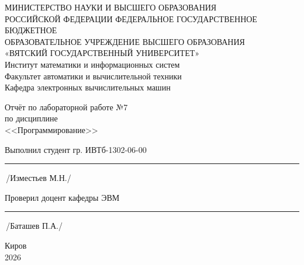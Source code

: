 \documentclass[oneside,a4paper,14pt]{extarticle}
\begin{document}
    \newpage\thispagestyle{empty}
    \begin{center}
        МИНИСТЕРСТВО НАУКИ И ВЫСШЕГО ОБРАЗОВАНИЯ\\
            РОССИЙСКОЙ ФЕДЕРАЦИИ
            ФЕДЕРАЛЬНОЕ ГОСУДАРСТВЕННОЕ БЮДЖЕТНОЕ\\
            ОБРАЗОВАТЕЛЬНОЕ
            УЧРЕЖДЕНИЕ ВЫСШЕГО ОБРАЗОВАНИЯ\\
            «ВЯТСКИЙ ГОСУДАРСТВЕННЫЙ УНИВЕРСИТЕТ»\\
            Институт математики и информационных систем\\
            Факультет автоматики и вычислительной техники\\
            Кафедра электронных вычислительных машин
    \end{center}
    \vspace{20mm}

    \begin{center}
        Отчёт по лабораторной работе №7\\
        по дисциплине\\
        <<Программирование>>\\
    \end{center}
    \vspace{48mm}

    Выполнил студент гр. ИВТб-1302-06-00 \hspace{10mm} \rule[-0,5mm]{30mm}{0.15mm}\,/Изместьев М.Н./


    Проверил доцент кафедры ЭВМ \hfill  \rule[-0,5mm]{30mm}{0.15mm}\,/Баташев П.А./

    \vfill
    \begin{center}
        Киров\\
        2026
    \end{center}

    \newpage\thispagestyle{empty}
\end{document}

